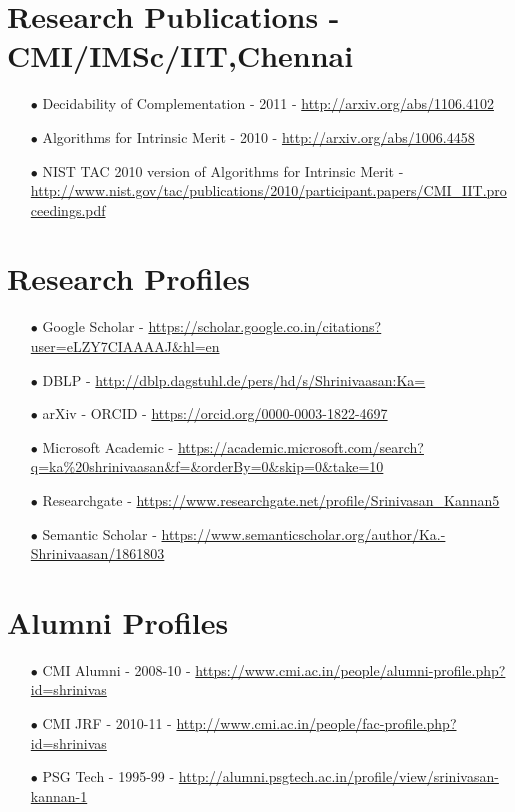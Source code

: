 \documentclass[11pt,onecolumn]{article}
\begin{document}
\section{Research Publications - CMI/IMSc/IIT,Chennai}
\begin{enumerate}
\item[$\bullet$] Decidability of Complementation - 2011 - \url {http://arxiv.org/abs/1106.4102}
\item[$\bullet$] Algorithms for Intrinsic Merit - 2010 - \url {http://arxiv.org/abs/1006.4458}
\item[$\bullet$] NIST TAC 2010 version of Algorithms for Intrinsic Merit - \\
 \url {http://www.nist.gov/tac/publications/2010/participant.papers/CMI_IIT.proceedings.pdf}
\end{enumerate}

\section{Research Profiles}
\begin{enumerate}
\item[$\bullet$] Google Scholar - \url {https://scholar.google.co.in/citations?user=eLZY7CIAAAAJ&hl=en }
\item[$\bullet$] DBLP - \url {http://dblp.dagstuhl.de/pers/hd/s/Shrinivaasan:Ka=}
\item[$\bullet$] arXiv - ORCID - \url {https://orcid.org/0000-0003-1822-4697}
\item[$\bullet$] Microsoft Academic - \url {https://academic.microsoft.com/search?q=ka%20shrinivaasan&f=&orderBy=0&skip=0&take=10}
\item[$\bullet$] Researchgate - \url {https://www.researchgate.net/profile/Srinivasan_Kannan5}
\item[$\bullet$] Semantic Scholar - \url {https://www.semanticscholar.org/author/Ka.-Shrinivaasan/1861803}
\end{enumerate}

\section{Alumni Profiles}
\begin{enumerate}
\item[$\bullet$] CMI Alumni - 2008-10 - \url {https://www.cmi.ac.in/people/alumni-profile.php?id=shrinivas}
\item[$\bullet$] CMI JRF - 2010-11 - \url {http://www.cmi.ac.in/people/fac-profile.php?id=shrinivas}
\item[$\bullet$] PSG Tech - 1995-99 - \url {http://alumni.psgtech.ac.in/profile/view/srinivasan-kannan-1}
\end{enumerate}
\end{document}
